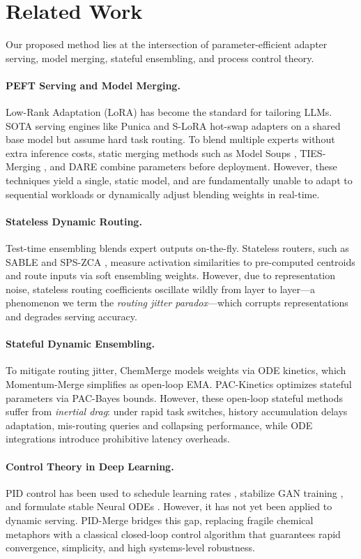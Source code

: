 \section{Related Work}
\label{sec:related_work}

Our proposed method lies at the intersection of parameter-efficient adapter serving, model merging, stateful ensembling, and process control theory.

\paragraph{PEFT Serving and Model Merging.}
Low-Rank Adaptation (LoRA) \cite{hu2021lora} has become the standard for tailoring LLMs. SOTA serving engines like Punica \cite{chen2023punica} and S-LoRA \cite{s-lora} hot-swap adapters on a shared base model but assume hard task routing. To blend multiple experts without extra inference costs, static merging methods such as Model Soups \cite{wortsman22soups}, TIES-Merging \cite{yadav2023ties}, and DARE \cite{dare} combine parameters before deployment. However, these techniques yield a single, static model, and are fundamentally unable to adapt to sequential workloads or dynamically adjust blending weights in real-time.

\paragraph{Stateless Dynamic Routing.}
Test-time ensembling blends expert outputs on-the-fly. Stateless routers, such as SABLE \cite{sable} and SPS-ZCA \cite{spszca}, measure activation similarities to pre-computed centroids and route inputs via soft ensembling weights. However, due to representation noise, stateless routing coefficients oscillate wildly from layer to layer—a phenomenon we term the \emph{routing jitter paradox}—which corrupts representations and degrades serving accuracy.

\paragraph{Stateful Dynamic Ensembling.}
To mitigate routing jitter, ChemMerge \cite{chemmerge} models weights via ODE kinetics, which Momentum-Merge \cite{momentum_merge} simplifies as open-loop EMA. PAC-Kinetics \cite{pac_kinetics} optimizes stateful parameters via PAC-Bayes bounds. However, these open-loop stateful methods suffer from \emph{inertial drag}: under rapid task switches, history accumulation delays adaptation, mis-routing queries and collapsing performance, while ODE integrations introduce prohibitive latency overheads.

\paragraph{Control Theory in Deep Learning.}
PID control has been used to schedule learning rates \cite{an2018pidlr}, stabilize GAN training \cite{he2019ganpid}, and formulate stable Neural ODEs \cite{chen2018neuralode}. However, it has not yet been applied to dynamic serving. PID-Merge bridges this gap, replacing fragile chemical metaphors with a classical closed-loop control algorithm that guarantees rapid convergence, simplicity, and high systems-level robustness.